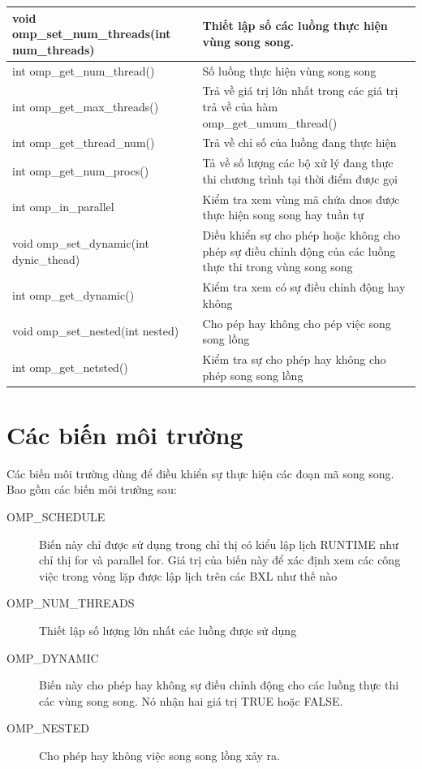\documentclass{report}
\begin{document}
\begin{tabular}{|p{7cm}|p{5cm}|}
	\hline  void omp\_set\_num\_threads(int num\_threads)&  Thiết lập số các luồng thực hiện vùng song song. \\
	\hline int omp\_get\_num\_thread() & Số luồng thực hiện vùng song song \\ 
	\hline int omp\_get\_max\_threads() & Trả về giá trị lớn nhất trong các giá trị trả về của hàm omp\_get\_umum\_thread() \\
	\hline  int omp\_get\_thread\_num()& Trả về chỉ số của luồng đang thực hiện  \\ 
	\hline  int omp\_get\_num\_procs()& Tả về số lượng các bộ xử lý đang thực thi chương trình tại thời điểm được gọi  \\ 
	\hline int omp\_in\_parallel & Kiểm tra xem vùng mã chứa dnos được thực hiện song song hay tuần tự  \\ 
	\hline void omp\_set\_dynamic(int dynic\_thead) & Diều khiển sự cho phép hoặc không cho phép sự điều chỉnh động của các luồng thực thi trong vùng song song \\ 
	\hline  int omp\_get\_dynamic()&  Kiểm tra xem có sự điều chỉnh động hay không \\ 
	\hline void omp\_set\_nested(int nested) & Cho pép hay không cho pép việc song song lồng \\ 
	\hline int omp\_get\_netsted() &  Kiểm tra sự cho phép hay không cho phép song song lồng \\ 
	\hline
	
\end{tabular} 

\section{Các biến môi trường}
Các biến môi trường dùng để điều khiển sự thực hiện các đoạn mã song song. Bao gồm các biến môi trường sau:
\begin{description}
	\item [OMP\_SCHEDULE] Biến này chỉ được sử dụng trong chỉ thị có kiểu lập lịch RUNTIME như chỉ thị for và parallel for. Giá trị của biến này để xác định xem các công việc trong vòng lặp được lập lịch trên các BXL như thế nào
	\item [OMP\_NUM\_THREADS] Thiết lập số lượng lớn nhất các luồng được sử dụng
	\item [OMP\_DYNAMIC] Biến này cho phép hay không sự điều chỉnh động cho các luồng thực thi các vùng song song. Nó nhận hai giá trị TRUE hoặc FALSE.
	\item [OMP\_NESTED]Cho phép hay không việc song song lồng xảy ra.
	\end{description}
\end{document}
